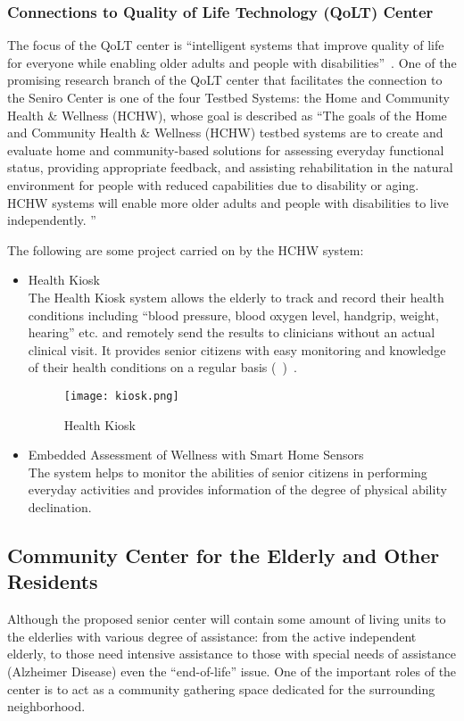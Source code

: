 \subsubsection{Connections to Quality of Life Technology (QoLT) Center}
The focus of the QoLT center is ``intelligent systems that improve
quality of life for everyone while enabling older adults and people
with disabilities''~\cite{QoLT2014}. One of the promising research
branch of the QoLT center that facilitates the connection to the
Seniro Center is one of the four Testbed Systems: the Home and
Community Health \& Wellness (HCHW), whose goal is described as ``The
goals of the Home and Community Health \& Wellness (HCHW) testbed
systems are to create and evaluate home and community-based solutions
for assessing everyday functional status, providing appropriate
feedback, and assisting rehabilitation in the natural environment for
people with reduced capabilities due to disability or aging.  HCHW
systems will enable more older adults and people with disabilities to
live independently. ''~\cite{HCHW}

The following are some project carried on by the HCHW system:
\begin{itemize}
\item Health Kiosk\\
  The Health Kiosk system allows the elderly to track and record their
  health conditions including ``blood pressure, blood oxygen level,
  handgrip, weight, hearing'' etc. and remotely send the results to
  clinicians without an actual clinical visit. It provides senior
  citizens with easy monitoring and knowledge of their health
  conditions on a regular basis (~)~\cite{Kiosk}.
 \begin{figure}[htbp]
   \centering
   \texttt{[image: kiosk.png]}
   \caption[Health Kiosk]{Health Kiosk~\cite{Kiosk}}
   \label{fig:kiosk}
\end{figure}
\item Embedded Assessment of Wellness with Smart Home Sensors\\
  The system helps to monitor the abilities of senior citizens in
  performing everyday activities and provides information of the
  degree of physical ability
  declination.~\cite{Lee:2010:EAW:1864431.1864490}
\end{itemize}

\subsection{Community Center for the Elderly and Other Residents}
Although the proposed senior center will contain some amount of living
units to the elderlies with various degree of assistance: from the
active independent elderly, to those need intensive assistance to
those with special needs of assistance (Alzheimer Disease) even the
``end-of-life'' issue. One of the important roles of the center is to
act as a community gathering space dedicated for the surrounding
neighborhood.

